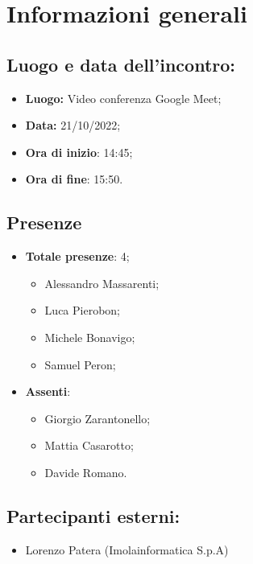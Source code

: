 \section{Informazioni generali}

\subsection{Luogo e data dell'incontro:}
\begin{itemize}
    \item \textbf{Luogo:} Video conferenza Google Meet;
    \item \textbf{Data:} 21/10/2022;
    \item \textbf{Ora di inizio}: 14:45;
    \item \textbf{Ora di fine}: 15:50.
\end{itemize}
\subsection{Presenze}
\begin{itemize}
    \item \textbf{Totale presenze}: 4;
    \begin{itemize}
        \item Alessandro Massarenti;
        \item Luca Pierobon;
        \item Michele Bonavigo;
        \item Samuel Peron;
    \end{itemize}
    \item \textbf{Assenti}:
    \begin{itemize}
        \item Giorgio Zarantonello;
        \item Mattia Casarotto;
        \item Davide Romano.
    \end{itemize}
\end{itemize}
\subsection{Partecipanti esterni:}
\begin{itemize}
    \item Lorenzo Patera (Imolainformatica S.p.A)
\end{itemize}